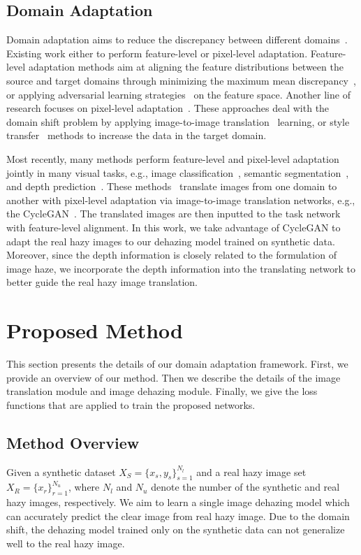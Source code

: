 \documentclass[10pt,twocolumn,letterpaper]{article}
\begin{document}
\subsection{Domain Adaptation}
Domain adaptation aims to reduce the discrepancy between different domains~\cite{atapour2018real,chen2018domain,long2013transfer}. 
Existing work either to perform feature-level or pixel-level adaptation.
Feature-level adaptation methods aim at aligning the feature distributions between the source and target domains through minimizing the maximum mean discrepancy~\cite{long2015learning}, or applying adversarial learning strategies~\cite{tzeng2017adversarial,tsai2018learning} on the feature space.
Another line of research focuses on pixel-level adaptation~\cite{bousmalis2017unsupervised, shrivastava2017learning, dundar2018domain}. 
These approaches deal with the domain shift problem by applying image-to-image translation~\cite{bousmalis2017unsupervised, shrivastava2017learning} learning, or style transfer~\cite{dundar2018domain} methods to increase the data in the target domain.
 
Most recently, many methods perform feature-level and pixel-level adaptation jointly in many visual tasks, e.g.,  image classification~\cite{hoffman2017cycada}, semantic segmentation~\cite{chen2019learning}, and depth prediction~\cite{zheng2018t2net}. 
These methods~\cite{chen2019learning,zheng2018t2net} translate images from one domain to another with pixel-level adaptation via image-to-image translation networks, e.g., the CycleGAN~\cite{zhu2017unpaired}.
The translated images are then inputted to the task network with feature-level alignment.
In this work, we take advantage of CycleGAN to adapt the real hazy images to our dehazing model trained on synthetic data. 
Moreover, since the depth information is closely related to the formulation of image haze, we incorporate the depth information into the translating network to better guide the real hazy image translation. 


\section{Proposed Method}
This section presents the details of our domain adaptation framework.
First, we provide an overview of our method. 
Then we describe the details of the image translation module and image dehazing module.
Finally, we give the loss functions that are applied to train the proposed networks.


\subsection{Method Overview}
Given a synthetic dataset ${X_S} = \{ {x_s},{y_s}\} _{s = 1}^{{N_l}}$ and a real hazy image set ${X_R} = \{ {x_r}\} _{r = 1}^{{N_u}}$, where ${N_l}$ and ${N_u}$ denote the number of the synthetic and real hazy images, respectively.
We aim to learn a single image dehazing model which can accurately predict the clear image from real hazy image. 
Due to the domain shift, the dehazing model trained only on the synthetic data can not generalize well to the real hazy image. 
\end{document}
